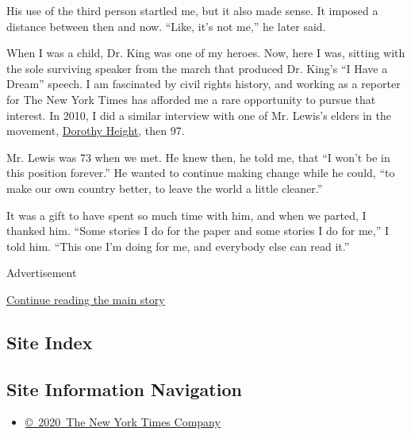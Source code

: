 His use of the third person startled me, but it also made sense. It
imposed a distance between then and now. ``Like, it's not me,'' he later
said.

When I was a child, Dr. King was one of my heroes. Now, here I was,
sitting with the sole surviving speaker from the march that produced Dr.
King's ``I Have a Dream'' speech. I am fascinated by civil rights
history, and working as a reporter for The New York Times has afforded
me a rare opportunity to pursue that interest. In 2010, I did a similar
interview with one of Mr. Lewis's elders in the movement,
\href{https://www.nytimes.com/video/obituaries/1247467659411/an-interview-with-dorothy-height.html}{Dorothy
Height}, then 97.

Mr. Lewis was 73 when we met. He knew then, he told me, that ``I won't
be in this position forever.'' He wanted to continue making change while
he could, ``to make our own country better, to leave the world a little
cleaner.''

It was a gift to have spent so much time with him, and when we parted, I
thanked him. ``Some stories I do for the paper and some stories I do for
me,'' I told him. ``This one I'm doing for me, and everybody else can
read it.''

Advertisement

\protect\hyperlink{after-bottom}{Continue reading the main story}

\hypertarget{site-index}{%
\subsection{Site Index}\label{site-index}}

\hypertarget{site-information-navigation}{%
\subsection{Site Information
Navigation}\label{site-information-navigation}}

\begin{itemize}
\tightlist
\item
  \href{https://help.nytimes.com/hc/en-us/articles/115014792127-Copyright-notice}{©~2020~The
  New York Times Company}
\end{itemize}

